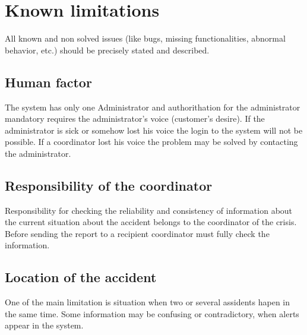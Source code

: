 \chapter{Known limitations}
\label{chap:know_limitations}


All known and non solved issues (like bugs, missing functionalities, abnormal
behavior, etc.) should be precisely stated and described.


\section{Human factor}
The system has only one Administrator and authorithation for the administrator
mandatory requires the administrator's voice (customer's desire). If the
administrator is sick or somehow lost his voice the login to the system will not
be possible. If a coordinator lost his voice the problem may be solved by
contacting the administrator.

\section{Responsibility of the coordinator}
Responsibility for checking the reliability and consistency of information about
the current situation about the accident belongs to the coordinator of the
crisis. Before sending the report to a recipient coordinator must fully check
the information.

\section{Location of the accident}
One of the main limitation is situation when two or several assidents hapen in
the same time. Some information may be confusing or contradictory, when alerts
appear in the system.